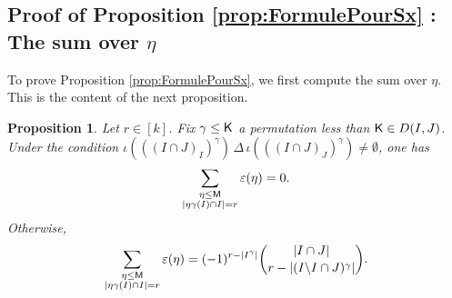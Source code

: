 \documentclass[11pt, a4paper, oneside, reqno]{amsart}
\newtheorem{proposition}[theorem]{Proposition}
\theoremstyle{remark}
\theoremstyle{definition}
\numberwithin{equation}{section}
\begin{document}
\subsection{Proof of Proposition \ref{prop:FormulePourSx} : The sum over $\eta$} To prove Proposition \ref{prop:FormulePourSx}, we first compute the sum over $\eta$. This is the content of the next proposition.
\begin{proposition}\label{prop:sumovereta}
		Let $r\in [k]$. Fix $\gamma \leq {\sf K}$ a permutation less than ${\sf K} \in D(I,J)$. Under the condition $\iota(((I\cap J)_I)^{\gamma}) \,\Delta \,\iota(((I\cap J)_J)^{\gamma}) \neq \emptyset$, one has
	$$
		\sum_{\substack{\eta \leq {\sf M}\\ |\eta\gamma(I)\cap I|=r}}\varepsilon(\eta)=0.
	$$
	Otherwise, 
	\begin{align*}
		\sum_{\substack{\eta \leq {\sf M} \\ |\eta\gamma(I)\cap I|=r}}\varepsilon(\eta)=
		(-1)^{r-|I^\gamma|} \binom{|I\cap J|}{r-|(I\backslash I \cap J)^{\gamma}|}.
	\end{align*}
\end{proposition}
\end{document}
